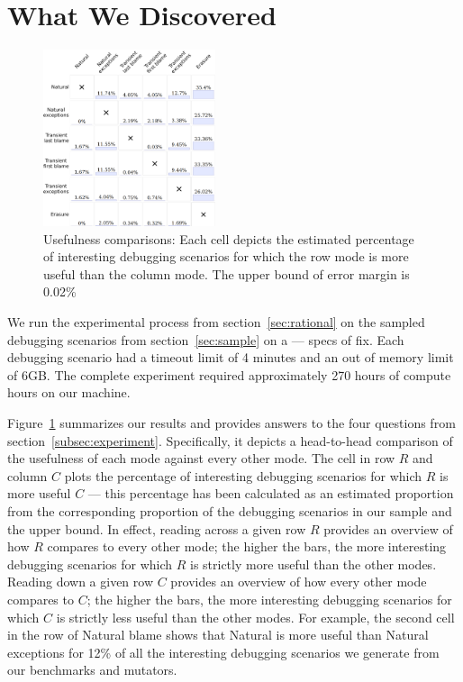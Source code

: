 \section{What We Discovered}

\begin{figure}
  \centering
  \includegraphics[width=0.45\textwidth]{./plots/avo-matrix}
  \caption{Usefulness comparisons: Each cell depicts the estimated percentage of
  interesting debugging scenarios for which the row mode is more useful
  than the column mode.
  The upper bound of error margin is 0.02\%}
  \label{fig:avo-matrix}
\end{figure}


We run the experimental process from section~\ref{sec:rational} on the
sampled debugging scenarios from section~\ref{sec:sample} on a --- specs
of fix. Each debugging scenario had a timeout limit of 4 minutes and an
out of memory limit of 6GB. The complete experiment required
approximately 270 hours of compute hours on our machine. 


Figure~\ref{fig:avo-matrix} summarizes our results and provides answers to
the four questions from section~\ref{subsec:experiment}.  Specifically, it
depicts a head-to-head comparison of the usefulness of each mode against
every other mode.  The cell in row $R$ and column $C$ plots the percentage
of interesting debugging scenarios for which $R$ is more useful $C$ ---
this percentage has been calculated as an estimated proportion from the
corresponding proportion of the debugging scenarios in our sample and the
upper bound.  In effect, reading across a given row $R$ provides an
overview of how $R$ compares to every other mode; the higher the bars, the
more interesting debugging scenarios for which $R$ is strictly more useful
than the other modes.  Reading down a given row $C$ provides an overview
of how every other mode compares to $C$; the higher the bars, the more
interesting debugging scenarios for which $C$ is strictly less useful than
the other modes. For example, the second cell in the row of Natural blame
shows that Natural is more useful than Natural exceptions for 12\% of all
the interesting debugging scenarios we generate from our benchmarks and
mutators. 

